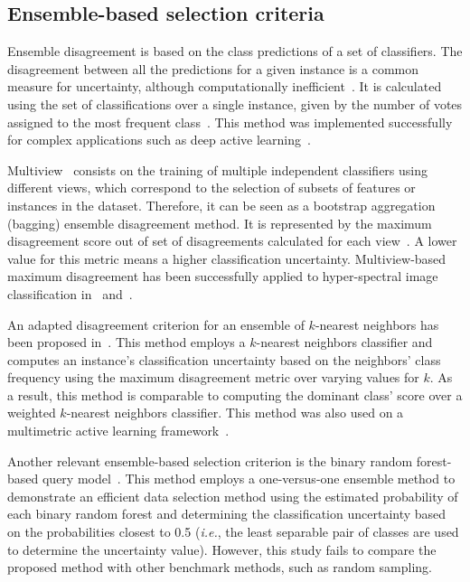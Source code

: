 \subsection{Ensemble-based selection criteria}

Ensemble disagreement is based on the class predictions of a set of
classifiers. The disagreement between all the predictions for a given
instance is a common measure for uncertainty, although computationally
inefficient~\cite{Ruzicka2020,Pasolli2016}. It is calculated using the set of
classifications over a single instance, given by the number of votes
assigned to the most frequent class~\cite{Shrivastava2021}. This method was
implemented successfully for complex applications such as deep active
learning~\cite{Ruzicka2020}.

Multiview~\cite{Muslea2006} consists on the training of multiple independent
classifiers using different views, which correspond to the selection of subsets
of features or instances in the dataset. Therefore, it can be seen as a
bootstrap aggregation (bagging) ensemble disagreement method. It is represented
by the maximum disagreement score out of set of disagreements calculated for
each view~\cite{Shrivastava2021}. A lower value for this metric means a higher
classification uncertainty. Multiview-based maximum disagreement has been
successfully applied to hyper-spectral image classification in~\cite{Di2012}
and~\cite{Zhou2014}.

An adapted disagreement criterion for an ensemble of $k$-nearest neighbors has
been proposed in~\cite{Pasolli2016}. This method employs a $k$-nearest
neighbors classifier and computes an instance's classification uncertainty
based on the neighbors' class frequency using the maximum disagreement metric
over varying values for $k$. As a result, this method is comparable to
computing the dominant class' score over a weighted $k$-nearest neighbors
classifier. This method was also used on a multimetric active learning
framework~\cite{Zhang2016}.

Another relevant ensemble-based selection criterion is the binary random
forest-based query model~\cite{Su2020}. This method employs a one-versus-one
ensemble method to demonstrate an efficient data selection method using the
estimated probability of each binary random forest and determining the
classification uncertainty based on the probabilities closest to 0.5
(\textit{i.e.}, the least separable pair of classes are used to determine the
uncertainty value). However, this study fails to compare the proposed method
with other benchmark methods, such as random sampling.

